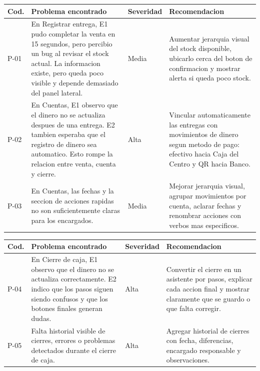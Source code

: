 \documentclass[12pt,letterpaper]{article}
\begin{document}
\begin{center}
\small
\begin{tabularx}{\textwidth}{|B{1.1cm}|Y|B{1.9cm}|Y|}
\hline
Cod. & Problema encontrado & Severidad & Recomendacion \\
\hline
P-01 & En Registrar entrega, E1 pudo completar la venta en 15 segundos, pero percibio un bug al revisar el stock actual. La informacion existe, pero queda poco visible y depende demasiado del panel lateral. & Media & Aumentar jerarquia visual del stock disponible, ubicarlo cerca del boton de confirmacion y mostrar alerta si queda poco stock. \\
\hline
P-02 & En Cuentas, E1 observo que el dinero no se actualiza despues de una entrega. E2 tambien esperaba que el registro de dinero sea automatico. Esto rompe la relacion entre venta, cuenta y cierre. & Alta & Vincular automaticamente las entregas con movimientos de dinero segun metodo de pago: efectivo hacia Caja del Centro y QR hacia Banco. \\
\hline
P-03 & En Cuentas, las fechas y la seccion de acciones rapidas no son suficientemente claras para los encargados. & Media & Mejorar jerarquia visual, agrupar movimientos por cuenta, aclarar fechas y renombrar acciones con verbos mas especificos. \\
\hline
\end{tabularx}
\end{center}

\vspace{6pt}

\begin{center}
\small
\begin{tabularx}{\textwidth}{|B{1.1cm}|Y|B{1.9cm}|Y|}
\hline
Cod. & Problema encontrado & Severidad & Recomendacion \\
\hline
P-04 & En Cierre de caja, E1 observo que el dinero no se actualiza correctamente. E2 indico que los pasos siguen siendo confusos y que los botones finales generan dudas. & Alta & Convertir el cierre en un asistente por pasos, explicar cada accion final y mostrar claramente que se guardo o que falta corregir. \\
\hline
P-05 & Falta historial visible de cierres, errores o problemas detectados durante el cierre de caja. & Alta & Agregar historial de cierres con fecha, diferencias, encargado responsable y observaciones. \\
\hline
\end{tabularx}
\end{center}
\end{document}

